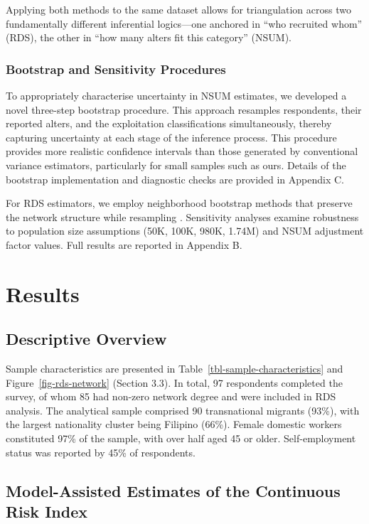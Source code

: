 \documentclass[
  12pt,
  letterpaper,
  DIV=11,
  numbers=noendperiod]{scrartcl}
\theoremstyle{plain}
\theoremstyle{definition}
\begin{document}
Applying both methods to the same dataset allows for triangulation
across two fundamentally different inferential logics---one anchored in
``who recruited whom'' (RDS), the other in ``how many alters fit this
category'' (NSUM).

\subsubsection{Bootstrap and Sensitivity
Procedures}\label{bootstrap-and-sensitivity-procedures}

To appropriately characterise uncertainty in NSUM estimates, we
developed a novel three-step bootstrap procedure. This approach
resamples respondents, their reported alters, and the exploitation
classifications simultaneously, thereby capturing uncertainty at each
stage of the inference process. This procedure provides more realistic
confidence intervals than those generated by conventional variance
estimators, particularly for small samples such as ours. Details of the
bootstrap implementation and diagnostic checks are provided in Appendix
C.

For RDS estimators, we employ neighborhood bootstrap methods that
preserve the network structure while resampling
\autocite{yauc22-neighborhood}. Sensitivity analyses examine robustness
to population size assumptions (50K, 100K, 980K, 1.74M) and NSUM
adjustment factor values. Full results are reported in Appendix B.

\section{Results}\label{results}

\subsection{Descriptive Overview}\label{descriptive-overview}

Sample characteristics are presented in
Table~\ref{tbl-sample-characteristics} and Figure~\ref{fig-rds-network}
(Section 3.3). In total, 97 respondents completed the survey, of whom 85
had non-zero network degree and were included in RDS analysis. The
analytical sample comprised 90 transnational migrants (93\%), with the
largest nationality cluster being Filipino (66\%). Female domestic
workers constituted 97\% of the sample, with over half aged 45 or older.
Self-employment status was reported by 45\% of respondents.

\subsection{Model-Assisted Estimates of the Continuous Risk
Index}\label{model-assisted-estimates-of-the-continuous-risk-index}
\end{document}
